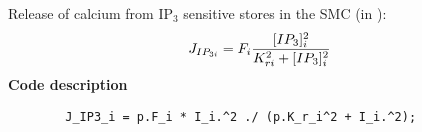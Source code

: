\documentclass[fleqn]{report}
\numberwithin{equation}{section}
\numberwithin{equation}{section}
\newcommand{\Cai}{\text{[Ca$^{2+}]_i$}}
\begin{document}
% 			           
		
% 	
% 						
% 						
% 	
 		Release of calcium from IP$_{3}$ sensitive stores in the SMC (in \uMps):
 		\begin{equation} \label{eq:IP3i}
 		J_{IP_{3i}} = F_{i}\frac{[IP_{3}]_{i}^{2}}{K_{ri}^{2}+[IP_{3}]_{i}^{2}}
 		\end{equation}
 		\textbf{Code description}
 		\begin{verbatim}
 		J_IP3_i = p.F_i * I_i.^2 ./ (p.K_r_i^2 + I_i.^2);
 		\end{verbatim}
\end{document}
